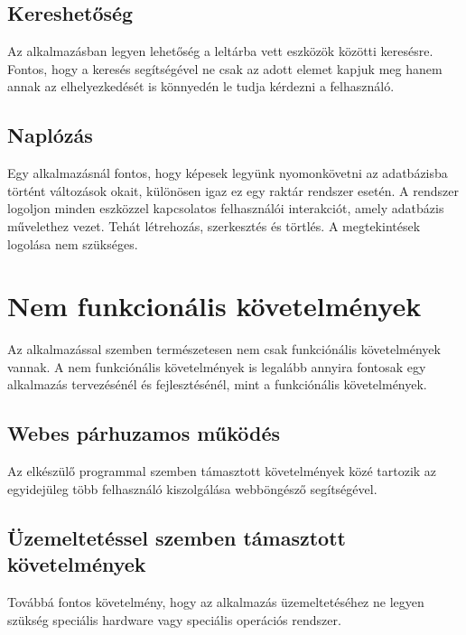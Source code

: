 \subsection{Kereshetőség}
Az alkalmazásban legyen lehetőség a leltárba vett eszközök közötti keresésre.
Fontos, hogy a keresés segítségével ne csak az adott elemet kapjuk meg hanem annak az elhelyezkedését is könnyedén le tudja kérdezni a felhasználó.

\subsection{Naplózás}
Egy alkalmazásnál fontos, hogy képesek legyünk nyomonkövetni az adatbázisba történt változások okait, különösen igaz ez egy raktár rendszer esetén.
A rendszer logoljon minden eszközzel kapcsolatos felhasználói interakciót, amely adatbázis művelethez vezet.
Tehát létrehozás, szerkesztés és törtlés. A megtekintések logolása nem szükséges.

\section{Nem funkcionális követelmények}

Az alkalmazással szemben természetesen nem csak funkciónális követelmények vannak.
A nem funkciónális követelmények is legalább annyira fontosak egy alkalmazás tervezésénél és fejlesztésénél, mint a funkciónális követelmények.

\subsection{Webes párhuzamos működés}

Az elkészülő programmal szemben támasztott követelmények közé tartozik az egyidejüleg több felhasználó kiszolgálása webböngésző segítségével.

\subsection{Üzemeltetéssel szemben támasztott követelmények}

Továbbá fontos követelmény, hogy az alkalmazás üzemeltetéséhez ne legyen szükség speciális hardware vagy speciális operációs rendszer.
